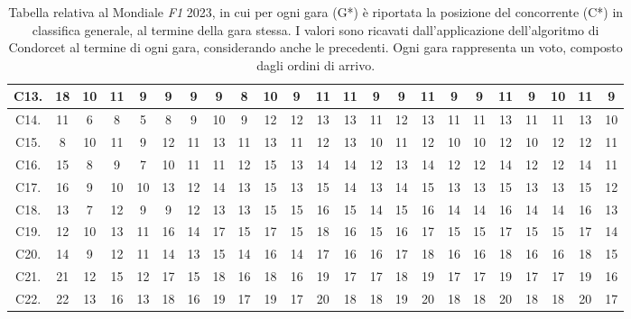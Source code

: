 \documentclass[12pt,a4paper,openright,twoside]{book}
\begin{document}
\begin{table}[H]
{\begin{tabular}{|c|c|c|c|c|c|c|c|c|c|c|c|c|c|c|c|c|c|c|c|c|c|c|}
    C13.  & 18 & 10 & 11 & 9 & 9 & 9 & 9 & 8 & 10 & 9 & 11 & 11 & 9 & 9 & 11 & 9 & 9 & 11 & 9 & 10 & 11 & 9 \\ \hline
    C14.  & 11 & 6 & 8 & 5 & 8 & 9 & 10 & 9 & 12 & 12 & 13 & 13 & 11 & 12 & 13 & 11 & 11 & 13 & 11 & 11 & 13 & 10 \\ \hline
    C15.  & 8 & 10 & 11 & 9 & 12 & 11 & 13 & 11 & 13 & 11 & 12 & 13 & 10 & 11 & 12 & 10 & 10 & 12 & 10 & 12 & 12 & 11 \\ \hline
    C16. & 15 & 8 & 9 & 7 & 10 & 11 & 11 & 12 & 15 & 13 & 14 & 14 & 12 & 13 & 14 & 12 & 12 & 14 & 12 & 12 & 14 & 11 \\ \hline
    C17.  & 16 & 9 & 10 & 10 & 13 & 12 & 14 & 13 & 15 & 13 & 15 & 14 & 13 & 14 & 15 & 13 & 13 & 15 & 13 & 13 & 15 & 12 \\ \hline
    C18. & 13 & 7 & 12 & 9 & 9 & 12 & 13 & 13 & 15 & 15 & 16 & 15 & 14 & 15 & 16 & 14 & 14 & 16 & 14 & 14 & 16 & 13 \\ \hline
    C19.  & 12 & 10 & 13 & 11 & 16 & 14 & 17 & 15 & 17 & 15 & 18 & 16 & 15 & 16 & 17 & 15 & 15 & 17 & 15 & 15 & 17 & 14 \\ \hline
    C20.  & 14 & 9 & 12 & 11 & 14 & 13 & 15 & 14 & 16 & 14 & 17 & 16 & 16 & 17 & 18 & 16 & 16 & 18 & 16 & 16 & 18 & 15 \\ \hline
    C21. & 21 & 12 & 15 & 12 & 17 & 15 & 18 & 16 & 18 & 16 & 19 & 17 & 17 & 18 & 19 & 17 & 17 & 19 & 17 & 17 & 19 & 16 \\ \hline
    C22.  & 22 & 13 & 16 & 13 & 18 & 16 & 19 & 17 & 19 & 17 & 20 & 18 & 18 & 19 & 20 & 18 & 18 & 20 & 18 & 18 & 20 & 17 \\ \hline
    \end{tabular}}
    \endgroup

    \caption{Tabella relativa al Mondiale \textit{F1} 2023, in cui per ogni gara (G*)  è riportata la posizione del concorrente (C*) in classifica generale, al termine della gara stessa.
    I valori sono ricavati dall'applicazione dell'algoritmo di Condorcet al termine di ogni gara, considerando anche le precedenti.
    Ogni gara rappresenta un voto, composto dagli ordini di arrivo.
    }
    \label{table:classifichegeneralicondorcet2023tabella}
\end{table}
\end{document}
